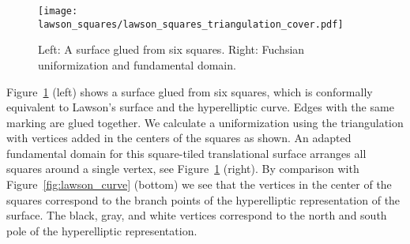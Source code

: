 \documentclass[Thesis]{subfiles}
\begin{document}



\begin{figure}
	\centering
	\resizebox{\textwidth}{!} {
	\texttt{[image: lawson\_squares/lawson\_squares\_triangulation\_cover.pdf]}
	}
	\caption{Left: A surface glued from six squares. Right:
          Fuchsian uniformization and fundamental domain.}
\label{fig:lawson_squares}
\end{figure}

Figure~\ref{fig:lawson_squares} (left) shows a surface glued from six
squares, which is conformally equivalent to Lawson's surface and the
hyperelliptic curve. Edges with the same marking are glued
together. We calculate a uniformization using the triangulation with
vertices added in the centers of the squares as shown. An adapted
fundamental domain for this square-tiled translational surface
arranges all squares around a single vertex, see
Figure~\ref{fig:lawson_squares} (right). By comparison with
Figure~\ref{fig:lawson_curve} (bottom) we see that the vertices in the
center of the squares correspond to the branch points of the
hyperelliptic representation of the surface. The black, gray, and
white vertices correspond to the north and south pole of the
hyperelliptic representation.

\subfilebibliography
\end{document}
